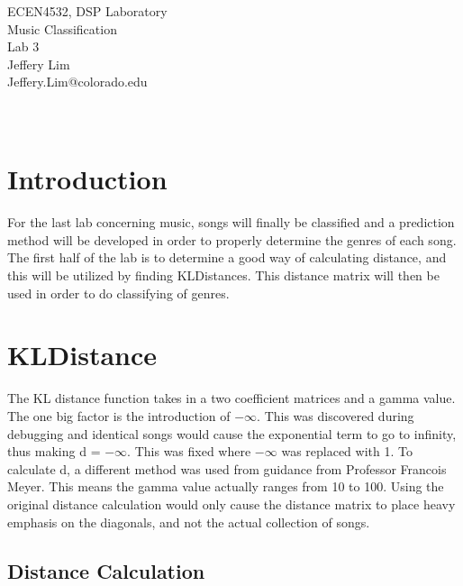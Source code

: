 \documentclass[11pt, a4paper]{article}
\begin{document}
\begin{center}
  \Huge ECEN4532, DSP Laboratory \\
  \huge Music Classification \\
  \huge Lab 3\\
  
  \vspace{7in}
    \huge Jeffery Lim \\
    \huge Jeffery.Lim@colorado.edu\\~\\~\\
\end{center}
\pagebreak

\tableofcontents

\pagebreak

\section{Introduction}

For the last lab concerning music, songs will finally be classified and a prediction method will be developed in order to properly determine the genres of each song. The first half of the lab is to determine a good way of calculating distance, and this will be utilized by finding KLDistances. This distance matrix will then be used in order to do classifying of genres.


\section{KLDistance}
The KL distance function takes in a two coefficient matrices and a gamma value. The one big factor is the introduction of $-\infty$. This was discovered during debugging and identical songs would cause the exponential term to go to infinity, thus making d = $-\infty$. This was fixed where $-\infty$ was replaced with 1. To calculate d, a different method was used from guidance from Professor Francois Meyer. This means the gamma value actually ranges from 10 to 100. Using the original distance calculation would only cause the distance matrix to place heavy emphasis on the diagonals, and not the actual collection of songs. 



\subsection{Distance Calculation}
\end{document}
